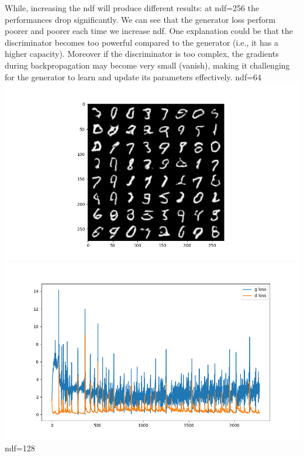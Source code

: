 While, increasing the ndf will produce different results: at ndf=256 the
performances drop significantly. We can see that the generator loss
perform poorer and poorer each time we increase ndf. One explanation
could be that the discriminator becomes too powerful compared to the
generator (i.e., it has a higher capacity). Moreover if the
discriminator is too complex, the gradients during backpropagation may
become very small (vanish), making it challenging for the generator to
learn and update its parameters effectively. ndf=64
\includegraphics{./images/Pasted image 20231228114134.png}\includegraphics{./images/Pasted image 20231228114145.png}
ndf=128
